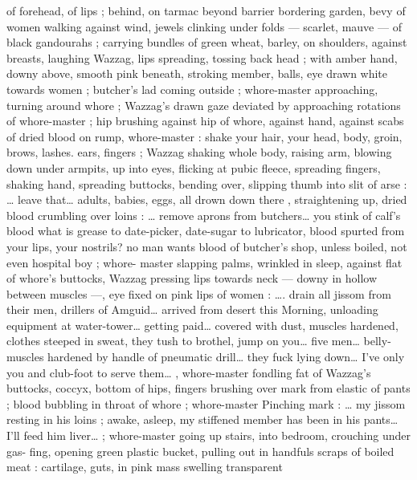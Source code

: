 of forehead, of lips ; behind, on tarmac beyond barrier bordering 
garden, bevy of women walking against wind, jewels clinking under 
folds --- scarlet, mauve --- of black gandourahs ; carrying bundles 
of green wheat, barley, on shoulders, against breasts, laughing 
Wazzag, lips spreading, tossing back head ; with amber hand, downy 
above, smooth pink beneath, stroking member, balls, eye drawn 
white towards women ; butcher's lad coming outside ; whore-master 
approaching, turning around whore ; Wazzag's drawn gaze deviated 
by approaching rotations of whore-master ; hip brushing against hip 
of whore, against hand, against scabs of dried blood on rump, 
whore-master :{\td} {\gl} {\td} shake your hair, your head, body, groin, brows, 
lashes. ears, fingers{\td} {\gr} ; Wazzag shaking whole body, raising arm, 
blowing down under armpits, up into eyes, flicking at pubic fleece, 
spreading fingers, shaking hand, spreading buttocks, bending over, 
slipping thumb into slit of arse : {\gl}{\ldots} leave that{\ldots} adults, babies, eggs, 
all drown down there{\td} {\gr}, straightening up, dried blood crumbling 
over loins : {\gl}{\ldots} remove aprons from butchers{\ldots} you stink of calf's 
blood{\td} what is grease to date-picker, date-sugar to lubricator, blood 
spurted from your lips, your nostrils?{\td} no man wants blood of 
butcher's shop, unless boiled,{\td} not even hospital boy {\gr} ; whore- 
master slapping palms, wrinkled in sleep, against flat of whore's 
buttocks, Wazzag pressing lips towards neck --- downy in hollow 
between muscles ---, eye fixed on pink lips of women : {\gl}{\ldots}. drain all 
jissom from their men, drillers of Amguid{\ldots} arrived from desert this 
Morning, unloading equipment at water-tower{\ldots} getting paid{\ldots} 
covered with dust, muscles hardened, clothes steeped in sweat, they 
tush to brothel, jump on you{\ldots} five men{\ldots} belly-muscles hardened by 
handle of pneumatic drill{\ldots} they fuck lying down{\ldots} I've only you and 
club-foot to serve them{\ldots} {\gr}, whore-master fondling fat of Wazzag's 
buttocks, coccyx, bottom of hips, fingers brushing over mark from 
elastic of pants ; blood bubbling in throat of whore ; whore-master 
Pinching mark : {\gl} {\ldots} my jissom resting in his loins ; awake, asleep, my 
stiffened member has been in his pants{\ldots} I'll feed him liver{\ldots} {\gr} ; 
whore-master going up stairs, into bedroom, crouching under gas- 
fing, opening green plastic bucket, pulling out in handfuls scraps of 
boiled meat : cartilage, guts, in pink mass swelling transparent 
